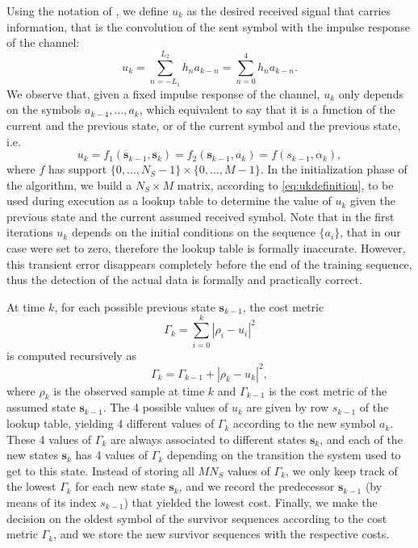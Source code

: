 \documentclass[10pt]{article}
\begin{document}
Using the notation of \cite{bc}, we define $u_k$ as the desired received signal that carries information, that is the convolution of the sent symbol with the impulse response of the channel:
\begin{equation}
u_k = \sum_{n=-L_1}^{L_2} h_n a_{k-n} = \sum_{n=0}^{4} h_n a_{k-n}.
\label{eq:ukdefinition}\end{equation}
We observe that, given a fixed impulse response of the channel, $u_k$ only depends on the symbols $a_{k-4},\ldots, a_k$, which equivalent to say that it is a function of the current and the previous state, or of the current symbol and the previous state, i.e.
\begin{equation}
u_k = f_1(\mathbf{s}_{k-1}, \mathbf{s}_k) = f_2(\mathbf{s}_{k-1}, a_k) = f(s_{k-1}, \alpha_k),
\end{equation}
where $f$ has support $\{0,\ldots,N_S-1\} \times \{0,\ldots,M-1\}$. In the initialization phase of the algorithm, we build a $N_S \times M$ matrix, according to \eqref{eq:ukdefinition}, to be used during execution as a lookup table to determine the value of $u_k$ given the previous state and the current assumed received symbol. Note that in the first iterations $u_k$ depends on the initial conditions on the sequence $\{a_i\}$, that in our case were set to zero, therefore the lookup table is formally inaccurate. However, this transient error disappears completely before the end of the training sequence, thus the detection of the actual data is formally and practically correct.

At time $k$, for each possible previous state $\mathbf{s}_{k-1}$, the cost metric
\begin{equation}
\Gamma_k = \sum_{i=0}^k |\rho_i - u_i|^2
\end{equation}
is computed recursively as
\begin{equation}
\Gamma_k = \Gamma_{k-1} + |\rho_k - u_k|^2,
\end{equation}
where $\rho_k$ is the observed sample at time $k$ and $\Gamma_{k-1}$ is the cost metric of the assumed state $\mathbf{s}_{k-1}$. The 4 possible values of $u_k$ are given by row $s_{k-1}$ of the lookup table, yielding 4 different values of $\Gamma_k$ according to the new symbol $a_k$. These 4 values of $\Gamma_k$ are always associated to different states $\mathbf{s}_k$, and each of the new states $\mathbf{s}_k$ has 4 values of $\Gamma_k$ depending on the transition the system used to get to this state. Instead of storing all $MN_S$ values of $\Gamma_k$, we only keep track of the lowest $\Gamma_k$ for each new state $\mathbf{s}_k$, and we record the predecessor $\mathbf{s}_{k-1}$ (by means of its index $s_{k-1}$) that yielded the lowest cost. Finally, we make the decision on the oldest symbol of the survivor sequences according to the cost metric $\Gamma_k$, and we store the new survivor sequences with the respective costs.
\end{document}
